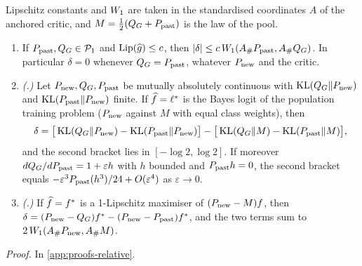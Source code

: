 \begin{proposition}\label{prop:anchored-target}
Lipschitz constants and $W_{1}$ are taken in the standardised coordinates $A$ of the anchored critic,
and $M=\tfrac12(Q_{G}+P_{\mathrm{past}})$ is the law of the pool.
\begin{enumerate}
  \item[(a)] If $P_{\mathrm{past}},Q_{G}\in\mathcal{P}_{1}$ and $\operatorname{Lip}(\widehat{g})\le c$, then
  $\lvert\delta\rvert\le c\,W_{1}(A_\#P_{\mathrm{past}},A_\#Q_{G})$. In particular $\delta=0$ whenever $Q_{G}=P_{\mathrm{past}}$,
  whatever $P_{\mathrm{new}}$ and the critic.
  \item[(b)] \emph{(\LRC{}.)} Let $P_{\mathrm{new}},Q_{G},P_{\mathrm{past}}$ be mutually absolutely continuous with
  $\operatorname{KL}(Q_{G}\Vert P_{\mathrm{new}})$ and $\operatorname{KL}(P_{\mathrm{past}}\Vert P_{\mathrm{new}})$ finite. If $\widehat{f}=\ell^{*}$ is the Bayes logit of
  the population training problem ($P_{\mathrm{new}}$ against $M$ with equal class weights), then
  \begin{equation}\label{eq:anchored-kl}
    \delta=\big[\operatorname{KL}(Q_{G}\Vert P_{\mathrm{new}})-\operatorname{KL}(P_{\mathrm{past}}\Vert P_{\mathrm{new}})\big]-\big[\operatorname{KL}(Q_{G}\Vert M)-\operatorname{KL}(P_{\mathrm{past}}\Vert M)\big],
  \end{equation}
  and the second bracket lies in $[-\log2,\log2]$. If moreover $dQ_{G}/dP_{\mathrm{past}}=1+\varepsilon h$ with
  $h$ bounded and $P_{\mathrm{past}} h=0$, the second bracket equals $-\varepsilon^3P_{\mathrm{past}}(h^3)/24+O(\varepsilon^4)$
  as $\varepsilon\to0$.
  \item[(c)] \emph{(\WC{}.)} If $\widehat{f}=f^*$ is a 1-Lipschitz maximiser of $(P_{\mathrm{new}}-M)f$, then
  $\delta=(P_{\mathrm{new}}-Q_{G})f^*-(P_{\mathrm{new}}-P_{\mathrm{past}})f^*$, and the two terms sum to $2\,W_{1}(A_\#P_{\mathrm{new}},A_\#M)$.
\end{enumerate}
\end{proposition}
\noindent\textit{Proof.} In \cref{app:proofs-relative}.

